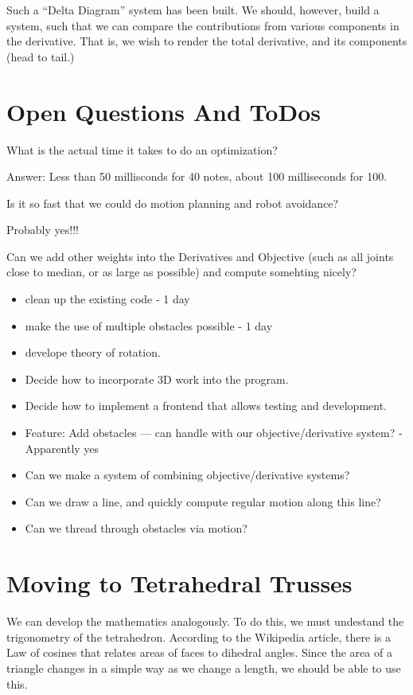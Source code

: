 \documentclass[11pt]{article}
\begin{document}
Such a ``Delta Diagram'' system has been built. We should, however, build a system, such that we can compare the contributions
from various components in the derivative. That is, we wish to render the total derivative, and its components (head to tail.)




\section{Open Questions And ToDos}

What is the actual time it takes to do an optimization?

Answer: Less than 50 millisconds for 40 notes, about 100 milliseconds for 100.

Is it so fast that we could do motion planning and robot avoidance?

Probably yes!!!

Can we add other weights into the Derivatives and Objective (such as all joints close to median, or as large as possible) and compute somehting nicely?

\begin{itemize}
\item clean up the existing code - 1 day
\item make the use of multiple obstacles possible - 1 day
\item develope theory of rotation.
  \item Decide how to incorporate 3D work into the program.
  \item Decide how to implement a frontend that allows testing and development.
    
\item Feature: Add obstacles --- can handle with our objective/derivative system? - Apparently yes
\item Can we make a system of combining objective/derivative systems?
\item Can we draw a line, and quickly compute regular motion along this line?
  \item Can we thread through obstacles via motion?
\end{itemize}

\section{Moving to Tetrahedral Trusses}

We can develop the mathematics analogously. To do this, we must undestand the trigonometry
of the tetrahedron. According to the Wikipedia
article\cite{https://en.wikipedia.org/wiki/Tetrahedron}, there is a Law of cosines that relates areas of faces to dihedral angles.
Since the area of a triangle changes in a simple way as we change a length, we
should be able to use this.
\end{document}
